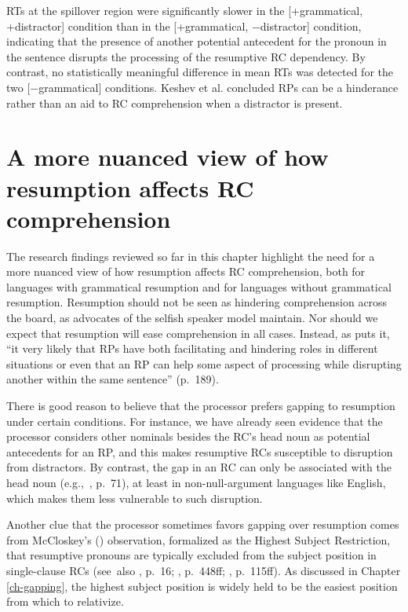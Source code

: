 \noindent RTs at the spillover region were significantly slower in the [+grammatical, +distractor] condition than in the [+grammatical, −distractor] condition, indicating that the presence of another potential antecedent for the pronoun in the sentence disrupts the processing of the resumptive RC dependency. By contrast, no statistically meaningful difference in mean RTs was detected for the two [−grammatical] conditions. Keshev et al. concluded RPs can be a hinderance rather than an aid to RC comprehension when a distractor is present.

\section{A more nuanced view of how resumption affects RC comprehension}\label{res-gapping}

The research findings reviewed so far in this chapter highlight the need for a more nuanced view of how resumption affects RC comprehension, both for languages with grammatical resumption and for languages without grammatical resumption. Resumption should not be seen as hindering comprehension across the board, as advocates of the selfish speaker model maintain. Nor should we expect that resumption will ease comprehension in all cases. Instead, as \textcite{meltzer-asscher2021} puts it, ``it very likely that RPs have both facilitating and hindering roles in different situations or even that an RP can help some aspect of processing while disrupting another within the same sentence'' (p.~189).

There is good reason to believe that the processor prefers gapping to resumption under certain conditions. For instance, we have already seen evidence that the processor considers other nominals besides the RC's head noun as potential antecedents for an RP, and this makes resumptive RCs susceptible to disruption from distractors. By contrast, the gap in an RC can only be associated with the head noun (e.g.,~\cite{goodall2017}, p.~71), at least in non-null-argument languages like English, which makes them less vulnerable to such disruption.

Another clue that the processor sometimes favors gapping over resumption comes from McCloskey's (\citeyear{mccloskey1990}) observation, formalized as the Highest Subject Restriction, that resumptive pronouns are typically excluded from the subject position in single-clause RCs (see~also \cite{erlewine2020}, p.~16; \cite{shlonsky1992}, p.~448ff; \cite{su.donati2023}, p.~115ff). As discussed in Chapter \ref{ch-gapping}, the highest subject position is widely held to be the easiest position from which to relativize.


